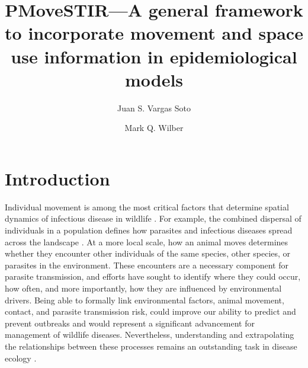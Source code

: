\documentclass[letterpaper]{article}
\title{PMoveSTIR---A general framework to incorporate movement and space use information in epidemiological models}
\author{Juan S. Vargas Soto \and Mark Q. Wilber}
\affil{School of Natural Resources, University of Tennessee, Knoxville, TN}
\date{}
\begin{document}
\maketitle

\section*{Introduction}

Individual movement is among the most critical factors that determine spatial dynamics of infectious disease in wildlife \citep{Manlove2022,Dougherty2022}. 
For example, the combined dispersal of individuals in a population defines how parasites and infectious diseases spread across the landscape \citep{Fofana2017}. 
At a more local scale, how an animal moves determines whether they encounter other individuals of the same species, other species, or parasites in the environment. 
These encounters are a necessary component for parasite transmission, and efforts have sought to identify where they could occur, how often, and more importantly, how they are influenced by environmental drivers.  
Being able to formally link environmental factors, animal movement, contact, and parasite transmission risk, could improve our ability to predict and prevent outbreaks and would represent a significant advancement for management of wildlife diseases. 
Nevertheless, understanding and extrapolating the relationships between these processes remains an outstanding task in disease ecology \citep{White2018}.
\end{document}
